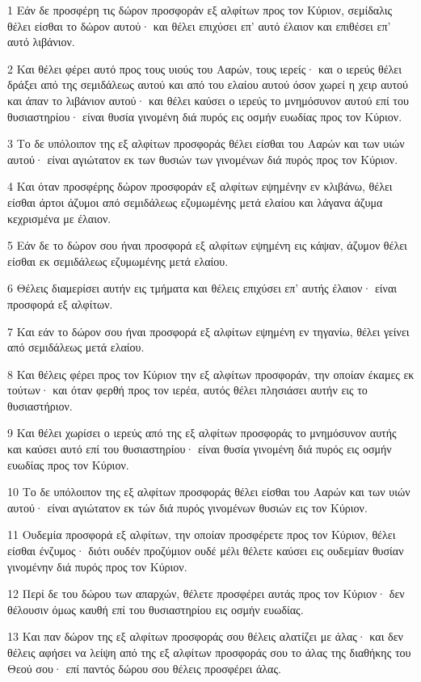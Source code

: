 \par 1 Εάν δε προσφέρη τις δώρον προσφοράν εξ αλφίτων προς τον Κύριον, σεμίδαλις θέλει είσθαι το δώρον αυτού· και θέλει επιχύσει επ' αυτό έλαιον και επιθέσει επ' αυτό λιβάνιον.
\par 2 Και θέλει φέρει αυτό προς τους υιούς του Ααρών, τους ιερείς· και ο ιερεύς θέλει δράξει από της σεμιδάλεως αυτού και από του ελαίου αυτού όσον χωρεί η χειρ αυτού και άπαν το λιβάνιον αυτού· και θέλει καύσει ο ιερεύς το μνημόσυνον αυτού επί του θυσιαστηρίου· είναι θυσία γινομένη διά πυρός εις οσμήν ευωδίας προς τον Κύριον.
\par 3 Το δε υπόλοιπον της εξ αλφίτων προσφοράς θέλει είσθαι του Ααρών και των υιών αυτού· είναι αγιώτατον εκ των θυσιών των γινομένων διά πυρός προς τον Κύριον.
\par 4 Και όταν προσφέρης δώρον προσφοράν εξ αλφίτων εψημένην εν κλιβάνω, θέλει είσθαι άρτοι άζυμοι από σεμιδάλεως εζυμωμένης μετά ελαίου και λάγανα άζυμα κεχρισμένα με έλαιον.
\par 5 Εάν δε το δώρον σου ήναι προσφορά εξ αλφίτων εψημένη εις κάψαν, άζυμον θέλει είσθαι εκ σεμιδάλεως εζυμωμένης μετά ελαίου.
\par 6 Θέλεις διαμερίσει αυτήν εις τμήματα και θέλεις επιχύσει επ' αυτής έλαιον· είναι προσφορά εξ αλφίτων.
\par 7 Και εάν το δώρον σου ήναι προσφορά εξ αλφίτων εψημένη εν τηγανίω, θέλει γείνει από σεμιδάλεως μετά ελαίου.
\par 8 Και θέλεις φέρει προς τον Κύριον την εξ αλφίτων προσφοράν, την οποίαν έκαμες εκ τούτων· και όταν φερθή προς τον ιερέα, αυτός θέλει πλησιάσει αυτήν εις το θυσιαστήριον.
\par 9 Και θέλει χωρίσει ο ιερεύς από της εξ αλφίτων προσφοράς το μνημόσυνον αυτής και καύσει αυτό επί του θυσιαστηρίου· είναι θυσία γινομένη διά πυρός εις οσμήν ευωδίας προς τον Κύριον.
\par 10 Το δε υπόλοιπον της εξ αλφίτων προσφοράς θέλει είσθαι του Ααρών και των υιών αυτού· είναι αγιώτατον εκ τών διά πυρός γινομένων θυσιών εις τον Κύριον.
\par 11 Ουδεμία προσφορά εξ αλφίτων, την οποίαν προσφέρετε προς τον Κύριον, θέλει είσθαι ένζυμος· διότι ουδέν προζύμιον ουδέ μέλι θέλετε καύσει εις ουδεμίαν θυσίαν γινομένην διά πυρός προς τον Κύριον.
\par 12 Περί δε του δώρου των απαρχών, θέλετε προσφέρει αυτάς προς τον Κύριον· δεν θέλουσιν όμως καυθή επί του θυσιαστηρίου εις οσμήν ευωδίας.
\par 13 Και παν δώρον της εξ αλφίτων προσφοράς σου θέλεις αλατίζει με άλας· και δεν θέλεις αφήσει να λείψη από της εξ αλφίτων προσφοράς σου το άλας της διαθήκης του Θεού σου· επί παντός δώρου σου θέλεις προσφέρει άλας.
